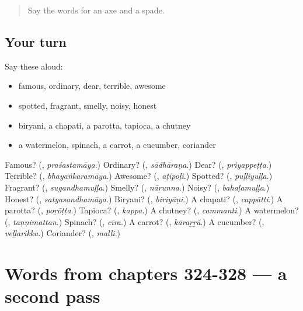 \label{lesson:ML-R328-first-pass-words-from-chapters-320-323}



\begin{quote}
Say the words for an axe and a spade.
\end{quote}

\subsection*{Your turn}
Say these aloud:

\begin{itemize}
\raggedright
  \item famous, ordinary, dear, terrible, awesome
  \item spotted, fragrant, smelly, noisy, honest
  \item biryani, a chapati, a parotta, tapioca, a chutney
  \item a watermelon, spinach, a carrot, a cucumber, coriander
\end{itemize}

\begin{tcolorbox}[breakable,colback=teal!4,colframe=teal!35!black,title={Before you move on}]
Famous? (\textbf{}, \emph{praśastamāya}.) Ordinary? (\textbf{}, \emph{sādhāraṇa}.) Dear? (\textbf{}, \emph{priyappeṭṭa}.) Terrible? (\textbf{}, \emph{bhayaṅkaramāya}.) Awesome? (\textbf{}, \emph{aṭipoḷi}.) Spotted? (\textbf{}, \emph{puḷḷiyuḷḷa}.) Fragrant? (\textbf{}, \emph{sugandhamuḷḷa}.) Smelly? (\textbf{}, \emph{nāṟunna}.) Noisy? (\textbf{}, \emph{bahaḷamuḷḷa}.) Honest? (\textbf{}, \emph{satyasandhamāya}.) Biryani? (\textbf{}, \emph{biriyāṇi}.) A chapati? (\textbf{}, \emph{cappātti}.) A parotta? (\textbf{}, \emph{poṟōṭṭa}.) Tapioca? (\textbf{}, \emph{kappa}.) A chutney? (\textbf{}, \emph{cammanti}.) A watermelon? (\textbf{}, \emph{taṇṇimattan}.) Spinach? (\textbf{}, \emph{cīra}.) A carrot? (\textbf{}, \emph{kāraṟṟŭ}.) A cucumber? (\textbf{}, \emph{veḷḷarikka}.) Coriander? (\textbf{}, \emph{malli}.)
\end{tcolorbox}
\section[(dialogue)]{Words from chapters 324-328 — a second pass}

